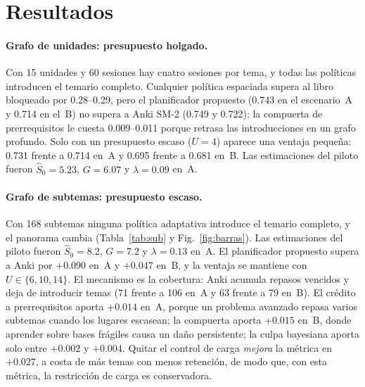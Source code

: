 \documentclass[runningheads]{llncs}
\newcommand{\Sh}{\hat S}
\begin{document}
\section{Resultados}
\label{sec:resultados}

\paragraph{Grafo de unidades: presupuesto holgado.} Con 15 unidades y 60 sesiones hay cuatro sesiones por tema, y todas las políticas introducen el temario completo. Cualquier política espaciada supera al libro bloqueado por 0.28--0.29, pero el planificador propuesto (0.743 en el escenario~A y 0.714 en el~B) no supera a Anki SM-2 (0.749 y 0.722); la compuerta de prerrequisitos le cuesta 0.009--0.011 porque retrasa las introducciones en un grafo profundo. Solo con un presupuesto escaso ($U=4$) aparece una ventaja pequeña: 0.731 frente a 0.714 en~A y 0.695 frente a 0.681 en~B. Las estimaciones del piloto fueron $\Sh_0=5.23$, $G=6.07$ y $\lambda=0.09$ en~A.

\paragraph{Grafo de subtemas: presupuesto escaso.} Con 168 subtemas ninguna política adaptativa introduce el temario completo, y el panorama cambia (Tabla~\ref{tab:sub} y Fig.~\ref{fig:barras}). Las estimaciones del piloto fueron $\Sh_0=8.2$, $G=7.2$ y $\lambda=0.13$ en~A. El planificador propuesto supera a Anki por $+0.090$ en~A y $+0.047$ en~B, y la ventaja se mantiene con $U\in\{6,10,14\}$. El mecanismo es la cobertura: Anki acumula repasos vencidos y deja de introducir temas (71 frente a 106 en~A y 63 frente a 79 en~B). El crédito a prerrequisitos aporta $+0.014$ en~A, porque un problema avanzado repasa varios subtemas cuando los lugares escasean; la compuerta aporta $+0.015$ en~B, donde aprender sobre bases frágiles causa un daño persistente; la culpa bayesiana aporta solo entre $+0.002$ y $+0.004$. Quitar el control de carga \emph{mejora} la métrica en $+0.027$, a costa de más temas con menos retención, de modo que, con esta métrica, la restricción de carga es conservadora.
\end{document}
